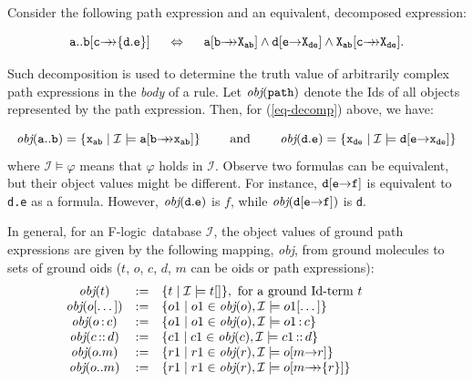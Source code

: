 \documentclass[11pt]{article}
\newcommand{\obj}{\textit{obj}\xspace}
\newcommand{\db}[1]{\ensuremath{\mathcal{#1}}}
\newcommand{\isa}{\,{\bf{:}}\,}
\newcommand{\subcl}{\,{\bf{::}}\,}
\newcommand{\fd}{\ensuremath{{\rightarrow}}}                   %
\newcommand{\mvd}{\ensuremath{{\rightarrow\!\!\!\!\rightarrow}}}  %
\newcommand{\fl}{\mbox{F-logic}\xspace}
\begin{document}
Consider the following path expression and an equivalent, decomposed
expression:

\begin{equation}\label{eq-decomp}
\tt
a..b[c\mvd\{d.e\}] \quad\ \Leftrightarrow \quad\  a[b\mvd X_{ab}]
\land d[e\fd X_{de}] \land X_{ab}[c\mvd X_{de}]. 
\end{equation}

\noindent
Such decomposition is used to determine the truth value of arbitrarily complex
path expressions in the \emph{body} of a rule.  Let $\tt \obj(path)$ denote
the Ids of all objects represented by the path expression. Then, for
(\ref{eq-decomp}) above, we have:

\begin{displaymath} \tt
\obj(a..b) = \{x_{ab} \mid \db I \models a[b\mvd x_{ab} ]\}
\qquad\textrm{ and }\qquad \obj(d.e) = \{x_{de} \mid \db I \models d[e\fd 
x_{de}]\} 
\end{displaymath}
%
where $\db I \models \varphi$ means that $\varphi$ holds in \db I.  Observe
two formulas can be equivalent, but their object values might be different.
For instance, $\tt d[e\fd f]$ is equivalent to {\tt d.e} as a formula.
However, $\tt \obj(d.e)$ is $f$, while $\tt \obj(d[e\fd f])$ is {\tt d}.

In general, for an \fl\ database \db I, the object values of ground path
expressions are given by the following mapping, \obj, from ground molecules
to sets of ground oids ($t$, $o$, $c$, $d$, $m$ can be oids or path
expressions):
%
\begin{displaymath}
  \begin{array}{cll@{\hspace{4em}}c}
    \obj(t) & := & \{t \mid  \db I\models t[] \}, 
     \textrm{ for a ground Id-term $t$}  \\   
    \obj(o[\dots]) & := & \{o1 \mid o1\in\obj(o), \db I \models o1[\dots]
    \} \\  
    \obj(o\isa c) & := & \{o1 \mid o1\in\obj(o), \db I \models o1\isa c\}
     \\ 
    \obj(c\subcl d) & := & \{c1 \mid c1\in\obj(c), \db I \models c1\subcl
    d\} \\ 
    \obj(o.m) & :=  & \{r1 \mid r1\in\obj(r), \db I \models o[m\fd
    r]\} \\ 
    \obj(o..m) & := &  \{r1 \mid  r1\in\obj(r), \db I \models
    o[m{\mvd}\{r\}] \}
  \end{array}
\end{displaymath}
\end{document}
